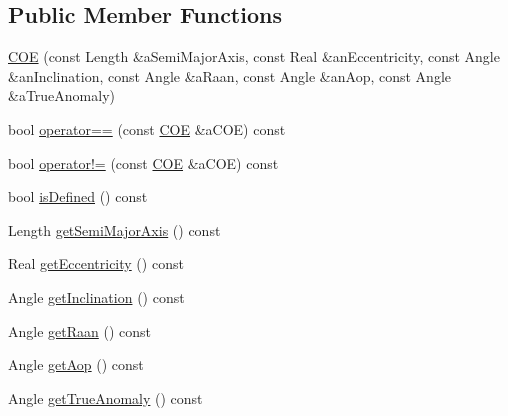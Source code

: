 \subsection*{Public Member Functions}
\begin{DoxyCompactItemize}
\item 
\hyperlink{classostk_1_1astro_1_1trajectory_1_1orbit_1_1models_1_1kepler_1_1_c_o_e_ad978e3d9271251a8ded920e56f2862f8}{C\+OE} (const Length \&a\+Semi\+Major\+Axis, const Real \&an\+Eccentricity, const Angle \&an\+Inclination, const Angle \&a\+Raan, const Angle \&an\+Aop, const Angle \&a\+True\+Anomaly)
\item 
bool \hyperlink{classostk_1_1astro_1_1trajectory_1_1orbit_1_1models_1_1kepler_1_1_c_o_e_a02a4cbc11da755b76c84cb89d191af12}{operator==} (const \hyperlink{classostk_1_1astro_1_1trajectory_1_1orbit_1_1models_1_1kepler_1_1_c_o_e}{C\+OE} \&a\+C\+OE) const
\item 
bool \hyperlink{classostk_1_1astro_1_1trajectory_1_1orbit_1_1models_1_1kepler_1_1_c_o_e_a072f00e44aa7f55d6433aa39c52f367e}{operator!=} (const \hyperlink{classostk_1_1astro_1_1trajectory_1_1orbit_1_1models_1_1kepler_1_1_c_o_e}{C\+OE} \&a\+C\+OE) const
\item 
bool \hyperlink{classostk_1_1astro_1_1trajectory_1_1orbit_1_1models_1_1kepler_1_1_c_o_e_a77c39d17b08185697c0e369de127053b}{is\+Defined} () const
\item 
Length \hyperlink{classostk_1_1astro_1_1trajectory_1_1orbit_1_1models_1_1kepler_1_1_c_o_e_a4ef3444242660722bd7b4d81df81e04f}{get\+Semi\+Major\+Axis} () const
\item 
Real \hyperlink{classostk_1_1astro_1_1trajectory_1_1orbit_1_1models_1_1kepler_1_1_c_o_e_aa560280115b92a228a6aa7a570870dcd}{get\+Eccentricity} () const
\item 
Angle \hyperlink{classostk_1_1astro_1_1trajectory_1_1orbit_1_1models_1_1kepler_1_1_c_o_e_a898cdb82f58745f66529fc0888be1442}{get\+Inclination} () const
\item 
Angle \hyperlink{classostk_1_1astro_1_1trajectory_1_1orbit_1_1models_1_1kepler_1_1_c_o_e_a76b2061390f51954a16579940c6a81c9}{get\+Raan} () const
\item 
Angle \hyperlink{classostk_1_1astro_1_1trajectory_1_1orbit_1_1models_1_1kepler_1_1_c_o_e_a046e29af64478c59cc37a60e62af0564}{get\+Aop} () const
\item 
Angle \hyperlink{classostk_1_1astro_1_1trajectory_1_1orbit_1_1models_1_1kepler_1_1_c_o_e_a291fe898d738de282115866339f6cb79}{get\+True\+Anomaly} () const
\item 

\end{DoxyCompactItemize}

